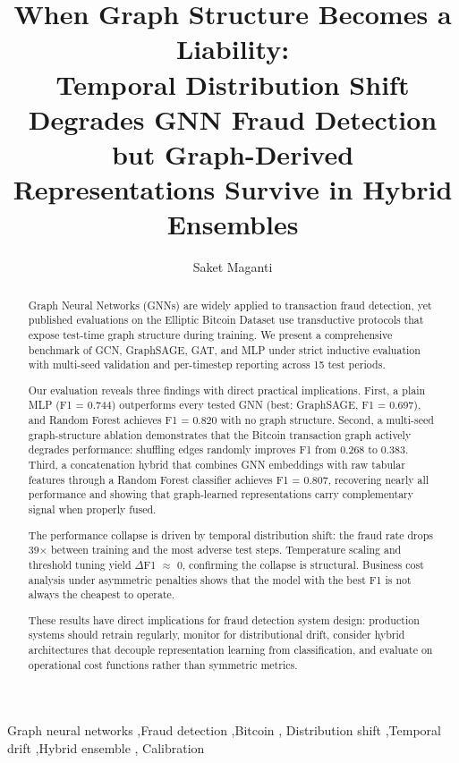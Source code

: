 \documentclass[preprint,12pt,a4paper]{elsarticle}
\begin{document}
\begin{frontmatter}

\title{When Graph Structure Becomes a Liability: \\
  Temporal Distribution Shift Degrades GNN Fraud Detection \\
  but Graph-Derived Representations Survive in Hybrid Ensembles}

\author{Saket Maganti}

\begin{abstract}
Graph Neural Networks (GNNs) are widely applied to transaction fraud
detection, yet published evaluations on the Elliptic Bitcoin Dataset
use transductive protocols that expose test-time graph structure during
training.  We present a comprehensive benchmark of GCN, GraphSAGE,
GAT, and MLP under strict inductive evaluation with multi-seed
validation and per-timestep reporting across 15 test periods.

Our evaluation reveals three findings with direct practical
implications.  First, a plain MLP (F1 = 0.744) outperforms every
tested GNN (best: GraphSAGE, F1 = 0.697), and Random Forest achieves
F1 = 0.820 with no graph structure.  Second, a multi-seed
graph-structure ablation demonstrates that the Bitcoin transaction
graph actively degrades performance: shuffling edges randomly improves
F1 from 0.268 to 0.383.  Third, a concatenation hybrid that combines
GNN embeddings with raw tabular features through a Random Forest
classifier achieves F1 = 0.807, recovering nearly all performance and
showing that graph-learned representations carry complementary signal
when properly fused.

The performance collapse is driven by temporal distribution shift: the
fraud rate drops 39$\times$ between training and the most adverse test
steps.  Temperature scaling and threshold tuning yield $\Delta$F1
$\approx$ 0, confirming the collapse is structural.  Business cost
analysis under asymmetric penalties shows that the model with the best
F1 is not always the cheapest to operate.

These results have direct implications for fraud detection system
design: production systems should retrain regularly, monitor for
distributional drift, consider hybrid architectures that decouple
representation learning from classification, and evaluate on
operational cost functions rather than symmetric metrics.
\end{abstract}

\begin{keyword}
  Graph neural networks \sep Fraud detection \sep Bitcoin \sep
  Distribution shift \sep Temporal drift \sep Hybrid ensemble \sep
  Calibration
\end{keyword}

\end{frontmatter}

\linenumbers





\end{document}
